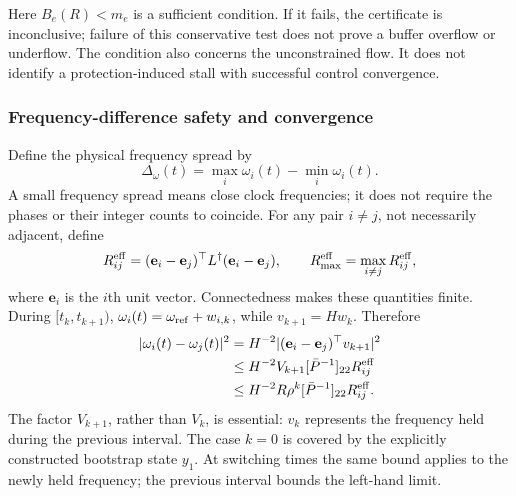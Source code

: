 Here $B_e(R)<m_e$ is a sufficient condition. If it fails, the certificate
is inconclusive; failure of this conservative test does not prove a
buffer overflow or underflow. The condition also concerns the
unconstrained flow. It does not identify a protection-induced stall
with successful control convergence.

\subsubsection{Frequency-difference safety and convergence}
Define the physical frequency spread by
\begin{equation}
 \Delta_\omega(t)=\max_i\omega_i(t)-\min_i\omega_i(t).
 \label{detail:eq:btd_frequency_spread}
\end{equation}
A small frequency spread means close clock frequencies; it does not
require the phases or their integer counts to coincide. For any pair
$i\ne j$, not necessarily adjacent, define
\begin{equation}
 R_{ij}^{\rm eff}=(\mathbf e_i-\mathbf e_j)^\top L^\dagger
                     (\mathbf e_i-\mathbf e_j),
 \qquad R_{\max}^{\rm eff}=\max_{i\ne j}R_{ij}^{\rm eff},
 \label{detail:eq:btd_pair_resistance}
\end{equation}
where $\mathbf e_i$ is the $i$th unit vector. Connectedness makes these
quantities finite. During $[t_k,t_{k+1})$, $\omega_i(t)=
\omega_{\rm ref}+w_{i,k}$, while $v_{k+1}=Hw_k$. Therefore
\begin{align}
 |\omega_i(t)-\omega_j(t)|^2
 &=H^{-2}|(\mathbf e_i-\mathbf e_j)^\top v_{k+1}|^2\nonumber\\
 &\le H^{-2}V_{k+1}[\bar P^{-1}]_{22}R_{ij}^{\rm eff}\nonumber\\
 &\le H^{-2}R\rho^k[\bar P^{-1}]_{22}R_{ij}^{\rm eff}.
 \label{detail:eq:btd_pair_frequency_bound}
\end{align}
The factor $V_{k+1}$, rather than $V_k$, is essential: $v_k$ represents
the frequency held during the previous interval. The case $k=0$ is
covered by the explicitly constructed bootstrap state $y_1$.
At switching times the same bound applies to the newly held frequency;
the previous interval bounds the left-hand limit.

